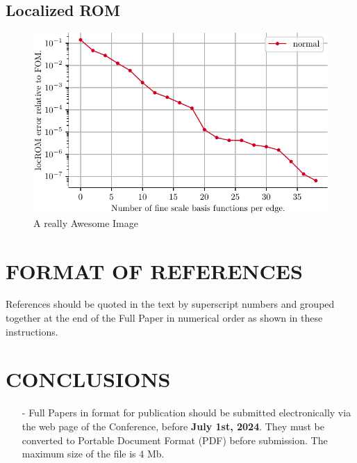 \documentclass[a4paper]{eccomas_paper-2024}
\begin{document}
\subsection{Localized ROM}

\begin{figure}[!htb]
    \includegraphics[width=\linewidth]{../figures/beam/fig_loc_rom_error.pdf}
    \caption{A really Awesome Image}\label{fig:loc_rom_error}
\end{figure}

\section{FORMAT OF REFERENCES}

References should be quoted in the text by superscript
numbers \cite{McQuerry18,nssga,Oden18} and grouped together at the end of the Full Paper in numerical order as shown in these instructions.

\section{CONCLUSIONS}

\begin{itemize}
\item[-] Full Papers in format for publication should be submitted electronically via the web page of the Conference, before \textbf{July 1st, 2024}. They must be converted to  Portable Document Format (PDF) before submission. The maximum size of the file is 4 Mb.
\end{itemize}
\end{document}
